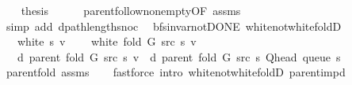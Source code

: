 \begin{isabellebody}
\ \ \isamarkupfalse%
\ {\isacharquery}{\kern0pt}thesis\isanewline
\ \ \ \ \isamarkupfalse%
\ parent{\isachardot}{\kern0pt}follow{\isacharunderscore}{\kern0pt}non{\isacharunderscore}{\kern0pt}empty{\isacharbrackleft}{\kern0pt}OF\ assms{\isacharparenleft}{\kern0pt}{}{\isacharparenright}{\kern0pt}{\isacharbrackright}{\kern0pt}\isanewline
\ \ \ \ \isamarkupfalse%
\ {\isacharparenleft}{\kern0pt}simp\ add{\isacharcolon}{\kern0pt}\ dpath{\isacharunderscore}{\kern0pt}length{\isacharunderscore}{\kern0pt}snoc{\isacharparenright}{\kern0pt}\isanewline
{}\isamarkupfalse%
%
\endisatagproof
{\isafoldproof}%
%
\isadelimproof
\isanewline
%
\endisadelimproof
%
\isadeliminvisible
\isanewline
%
\endisadeliminvisible
%
\isataginvisible
{}\isamarkupfalse%
\ {\isacharparenleft}{\kern0pt}\ bfs{\isacharunderscore}{\kern0pt}invar{\isacharunderscore}{\kern0pt}not{\isacharunderscore}{\kern0pt}DONE{\isacharparenright}{\kern0pt}\ white{\isacharunderscore}{\kern0pt}not{\isacharunderscore}{\kern0pt}white{\isacharunderscore}{\kern0pt}foldD{\isacharunderscore}{\kern0pt}{}{\isacharcolon}{\kern0pt}\isanewline
\ \ \ {\isachardoublequoteopen}white\ s\ v{\isachardoublequoteclose}\isanewline
\ \ \ {\isachardoublequoteopen}{\isasymnot}\ white\ {\isacharparenleft}{\kern0pt}fold\ G\ src\ s{\isacharparenright}{\kern0pt}\ v{\isachardoublequoteclose}\isanewline
\ \ \ {\isachardoublequoteopen}d\ {\isacharparenleft}{\kern0pt}parent\ {\isacharparenleft}{\kern0pt}fold\ G\ src\ s{\isacharparenright}{\kern0pt}{\isacharparenright}{\kern0pt}\ v\ {\isacharequal}{\kern0pt}\ d\ {\isacharparenleft}{\kern0pt}parent\ {\isacharparenleft}{\kern0pt}fold\ G\ src\ s{\isacharparenright}{\kern0pt}{\isacharparenright}{\kern0pt}\ {\isacharparenleft}{\kern0pt}Q{\isacharunderscore}{\kern0pt}head\ {\isacharparenleft}{\kern0pt}queue\ s{\isacharparenright}{\kern0pt}{\isacharparenright}{\kern0pt}\ {\isacharplus}{\kern0pt}\ {}{\isachardoublequoteclose}%
\endisataginvisible
{\isafoldinvisible}%
%
\isadeliminvisible
\isanewline
%
\endisadeliminvisible
%
\isadelimproof
\ \ %
\endisadelimproof
%
\isatagproof
{}\isamarkupfalse%
\ parent{\isacharunderscore}{\kern0pt}fold\ assms\isanewline
\ \ \isamarkupfalse%
\ {\isacharparenleft}{\kern0pt}fastforce\ intro{\isacharcolon}{\kern0pt}\ white{\isacharunderscore}{\kern0pt}not{\isacharunderscore}{\kern0pt}white{\isacharunderscore}{\kern0pt}foldD{\isacharparenleft}{\kern0pt}{}{\isacharparenright}{\kern0pt}\ parent{\isacharunderscore}{\kern0pt}imp{\isacharunderscore}{\kern0pt}d{\isacharparenright}{\kern0pt}%

\end{isabellebody}
